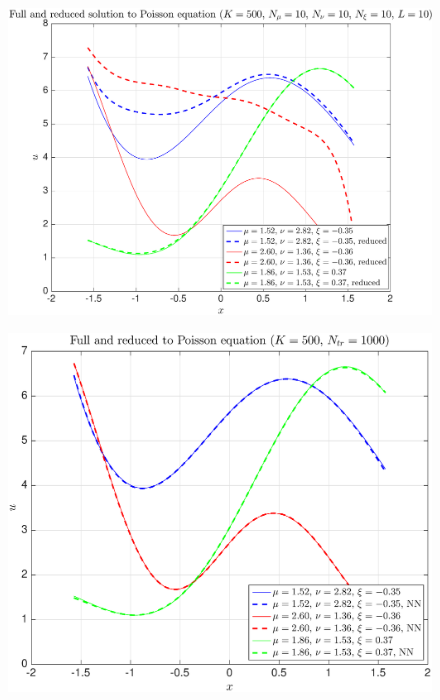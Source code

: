 \documentclass[11pt,a4paper]{article}
\theoremstyle{definition}
\theoremstyle{theorem}
\numberwithin{equation}{section}
\begin{document}
	\begin{figure}[H]
		\center
		\includegraphics[scale = 0.5]{fig13}
		\caption{}
	\end{figure}
	
	\begin{figure}[H]
		\center
		\includegraphics[scale = 0.5]{fig14}
		\caption{}
	\end{figure}
	
\end{document}
